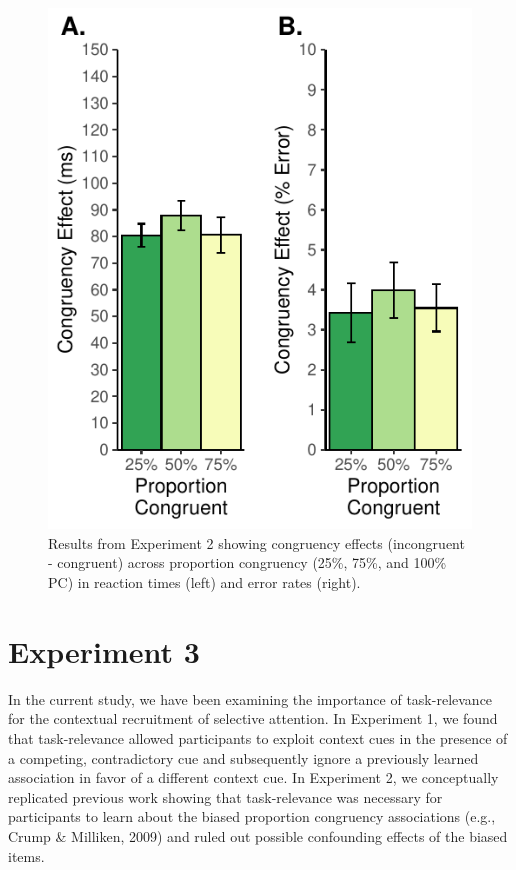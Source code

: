 \documentclass[english,,man,floatsintext]{apa6}
\begin{document}
\begin{figure}
\centering
\includegraphics{manuscript_pretty_files/figure-latex/figure3-1.pdf}
\caption{\label{fig:figure3}Results from Experiment 2 showing congruency effects (incongruent - congruent) across proportion congruency (25\%, 75\%, and 100\% PC) in reaction times (left) and error rates (right).}
\end{figure}



\hypertarget{experiment-3}{%
\section{Experiment 3}\label{experiment-3}}

In the current study, we have been examining the importance of task-relevance for the contextual recruitment of selective attention. In Experiment 1, we found that task-relevance allowed participants to exploit context cues in the presence of a competing, contradictory cue and subsequently ignore a previously learned association in favor of a different context cue. In Experiment 2, we conceptually replicated previous work showing that task-relevance was necessary for participants to learn about the biased proportion congruency associations (e.g., Crump \& Milliken, 2009) and ruled out possible confounding effects of the biased items.
\end{document}
